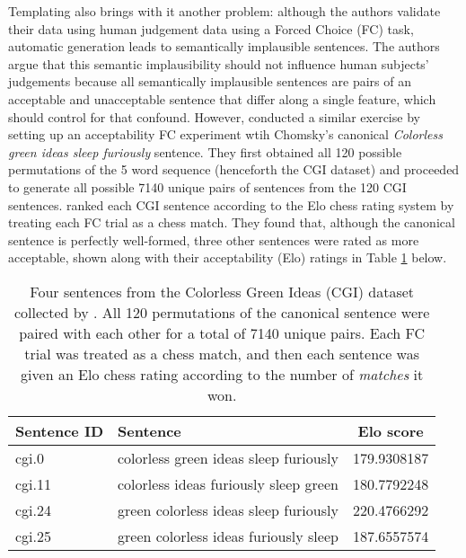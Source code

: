 Templating also brings with it another problem: although the authors validate their data using human judgement data using a Forced Choice (FC) task, automatic generation leads to semantically implausible sentences.  The authors argue that this semantic implausibility should not influence human subjects' judgements because all semantically implausible sentences are pairs of an acceptable and unacceptable sentence that differ along a single feature, which should control for that confound.  However, \citet{sprouse2018colorless} conducted a similar exercise by setting up an acceptability FC experiment wtih Chomsky's canonical \textit{Colorless green ideas sleep furiously} sentence.  They first obtained all 120 possible permutations of the 5 word sequence (henceforth the CGI dataset) and proceeded to generate all possible 7140 unique pairs of sentences from the 120 CGI sentences.  \citet{sprouse2018colorless} ranked each CGI sentence according to the Elo chess rating system by treating each FC trial as a chess match.  They found that, although the canonical sentence is perfectly well-formed, three other sentences were rated as more acceptable, shown along with their acceptability (Elo) ratings in Table \ref{tab:table_1} below.
\begin{table}[h]
    \centering
    \begin{tabular}{llc}
    \toprule
    \textbf{Sentence ID} & \textbf{Sentence} & \textbf{Elo score} \\
    \midrule
    cgi.0 & colorless green ideas sleep furiously & 179.9308187 \\
    \midrule
    cgi.11 & colorless ideas furiously sleep green & 180.7792248 \\
    cgi.24 & green colorless ideas sleep furiously & 220.4766292 \\
    cgi.25 & green colorless ideas furiously sleep & 187.6557574 \\
    \bottomrule
    \end{tabular}
    \caption[Four acceptable sentences from the CGI dataset]{Four sentences from the Colorless Green Ideas (CGI) dataset collected by \citet{sprouse2018colorless}.  All 120 permutations of the canonical sentence were paired with each other for a total of 7140 unique pairs.  Each FC trial was treated as a chess match, and then each sentence was given an Elo chess rating according to the number of \textit{matches} it won.}
    \label{tab:table_1}
\end{table}


